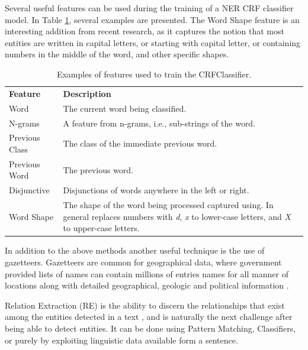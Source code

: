 \documentclass[11pt,a4paper,openright]{memoir}
\begin{document}
Several useful features can be used during the training of a NER CRF classifier model. In Table \ref{tab:ner_features}, several examples are presented. The Word Shape feature is an interesting addition from recent research, as it captures the notion that most entities are written in capital letters, or starting with capital letter, or containing numbers in the middle of the word, and other specific shapes.

\begin{table}[!htbp]
  \centering
    \begin{tabular}{ll}
      \textbf{Feature}          & \textbf{Description} \\
      Word                      & The current word being classified.          \\
      N-grams                   & \parbox[t]{9cm}{A feature from n-grams, i.e., sub-strings of the word.} \\
      Previous Class            & The class of the immediate previous word.          \\
      Previous Word             & The previous word.          \\
      Disjunctive               & \parbox[t]{9cm}{Disjunctions of words anywhere in the left or right.} \\
      Word Shape                & \parbox[t]{9cm}{The shape of the word being processed captured using. In general replaces numbers with \emph{d}, \emph{x} to lower-case letters, and \emph{X} to upper-case letters.} \\
    \end{tabular}
  \caption[Possible features to train the CRFClassifier.]{Examples of features used to train the CRFClassifier.}
  \label{tab:ner_features}
\end{table}

In addition to the above methods another useful technique is the use of gazetteers. Gazetteers are common for geographical data, where government provided lists of names can contain millions of entries names for all manner of locations along with detailed geographical, geologic and political information \cite{Jurafsky:2000:SLP:555733}.

Relation Extraction (RE) is the ability to discern the relationships that exist among the entities detected in a text \cite{Jurafsky:2000:SLP:555733}, and is naturally the next challenge after being able to detect entities. It can be done using Pattern Matching, Classifiers, or purely by exploiting linguistic data available form a sentence.
\end{document}
